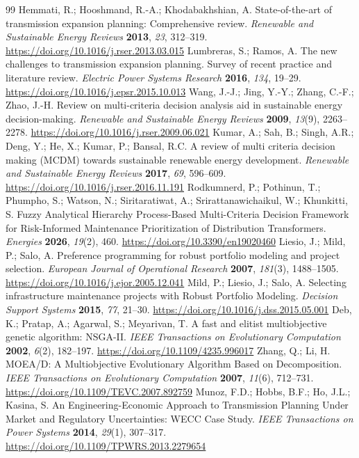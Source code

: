\documentclass[energies,article,submit,moreauthors]{Definitions/mdpi}
\begin{document}
\begin{thebibliography}{99}
 Hemmati, R.; Hooshmand, R.-A.; Khodabakhshian, A. State-of-the-art of transmission expansion planning: Comprehensive review. \emph{Renewable and Sustainable Energy Reviews} \textbf{2013}, \emph{23}, 312--319. \url{https://doi.org/10.1016/j.rser.2013.03.015}
 Lumbreras, S.; Ramos, A. The new challenges to transmission expansion planning. Survey of recent practice and literature review. \emph{Electric Power Systems Research} \textbf{2016}, \emph{134}, 19--29. \url{https://doi.org/10.1016/j.epsr.2015.10.013}
 Wang, J.-J.; Jing, Y.-Y.; Zhang, C.-F.; Zhao, J.-H. Review on multi-criteria decision analysis aid in sustainable energy decision-making. \emph{Renewable and Sustainable Energy Reviews} \textbf{2009}, \emph{13}(9), 2263--2278. \url{https://doi.org/10.1016/j.rser.2009.06.021}
 Kumar, A.; Sah, B.; Singh, A.R.; Deng, Y.; He, X.; Kumar, P.; Bansal, R.C. A review of multi criteria decision making (MCDM) towards sustainable renewable energy development. \emph{Renewable and Sustainable Energy Reviews} \textbf{2017}, \emph{69}, 596--609. \url{https://doi.org/10.1016/j.rser.2016.11.191}
 Rodkumnerd, P.; Pothinun, T.; Phumpho, S.; Watson, N.; Siritaratiwat, A.; Srirattanawichaikul, W.; Khunkitti, S. Fuzzy Analytical Hierarchy Process-Based Multi-Criteria Decision Framework for Risk-Informed Maintenance Prioritization of Distribution Transformers. \emph{Energies} \textbf{2026}, \emph{19}(2), 460. \url{https://doi.org/10.3390/en19020460}
 Liesio, J.; Mild, P.; Salo, A. Preference programming for robust portfolio modeling and project selection. \emph{European Journal of Operational Research} \textbf{2007}, \emph{181}(3), 1488--1505. \url{https://doi.org/10.1016/j.ejor.2005.12.041}
 Mild, P.; Liesio, J.; Salo, A. Selecting infrastructure maintenance projects with Robust Portfolio Modeling. \emph{Decision Support Systems} \textbf{2015}, \emph{77}, 21--30. \url{https://doi.org/10.1016/j.dss.2015.05.001}
 Deb, K.; Pratap, A.; Agarwal, S.; Meyarivan, T. A fast and elitist multiobjective genetic algorithm: NSGA-II. \emph{IEEE Transactions on Evolutionary Computation} \textbf{2002}, \emph{6}(2), 182--197. \url{https://doi.org/10.1109/4235.996017}
 Zhang, Q.; Li, H. MOEA/D: A Multiobjective Evolutionary Algorithm Based on Decomposition. \emph{IEEE Transactions on Evolutionary Computation} \textbf{2007}, \emph{11}(6), 712--731. \url{https://doi.org/10.1109/TEVC.2007.892759}
 Munoz, F.D.; Hobbs, B.F.; Ho, J.L.; Kasina, S. An Engineering-Economic Approach to Transmission Planning Under Market and Regulatory Uncertainties: WECC Case Study. \emph{IEEE Transactions on Power Systems} \textbf{2014}, \emph{29}(1), 307--317. \url{https://doi.org/10.1109/TPWRS.2013.2279654}

\end{thebibliography}
\end{document}
